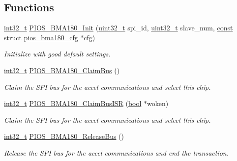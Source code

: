 \subsection*{Functions}
\begin{DoxyCompactItemize}
\item 
\hyperlink{group___n_a_m_e_gafd12020da5a235dfcf0c3c748fb5baed}{int32\-\_\-t} \hyperlink{group___p_i_o_s___b_m_a180_ga913e423478cf470fc5691ea8d62bca65}{P\-I\-O\-S\-\_\-\-B\-M\-A180\-\_\-\-Init} (\hyperlink{stdint_8h_a435d1572bf3f880d55459d9805097f62}{uint32\-\_\-t} spi\-\_\-id, \hyperlink{stdint_8h_a435d1572bf3f880d55459d9805097f62}{uint32\-\_\-t} slave\-\_\-num, \hyperlink{group___n_a_m_e_ga7ae6d0e43244213b34de2c2b9aa30da6}{const} struct \hyperlink{structpios__bma180__cfg}{pios\-\_\-bma180\-\_\-cfg} $\ast$cfg)
\begin{DoxyCompactList}\small\item\em Initialize with good default settings. \end{DoxyCompactList}\item 
\hyperlink{group___n_a_m_e_gafd12020da5a235dfcf0c3c748fb5baed}{int32\-\_\-t} \hyperlink{group___p_i_o_s___b_m_a180_ga6445f37d7393a3cf869f14425d4f8f60}{P\-I\-O\-S\-\_\-\-B\-M\-A180\-\_\-\-Claim\-Bus} ()
\begin{DoxyCompactList}\small\item\em Claim the S\-P\-I bus for the accel communications and select this chip. \end{DoxyCompactList}\item 
\hyperlink{group___n_a_m_e_gafd12020da5a235dfcf0c3c748fb5baed}{int32\-\_\-t} \hyperlink{group___p_i_o_s___b_m_a180_gaa4ed3d63ee77fc3f34b4c307f5552d15}{P\-I\-O\-S\-\_\-\-B\-M\-A180\-\_\-\-Claim\-Bus\-I\-S\-R} (\hyperlink{group___exported__types_gaf6a258d8f3ee5206d682d799316314b1}{bool} $\ast$woken)
\begin{DoxyCompactList}\small\item\em Claim the S\-P\-I bus for the accel communications and select this chip. \end{DoxyCompactList}\item 
\hyperlink{group___n_a_m_e_gafd12020da5a235dfcf0c3c748fb5baed}{int32\-\_\-t} \hyperlink{group___p_i_o_s___b_m_a180_ga1027b4d7c9d37660697a5093f7077a42}{P\-I\-O\-S\-\_\-\-B\-M\-A180\-\_\-\-Release\-Bus} ()
\begin{DoxyCompactList}\small\item\em Release the S\-P\-I bus for the accel communications and end the transaction. \end{DoxyCompactList}\item 

\end{DoxyCompactItemize}

